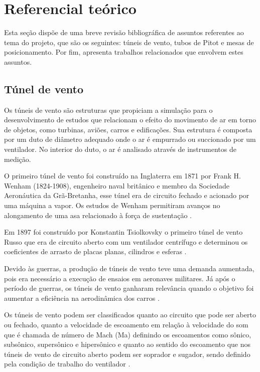 \chapter{Referencial teórico}\label{ch:referencial}

Esta seção dispõe de uma breve revisão bibliográfica de assuntos referentes ao tema do projeto, que são 
os seguintes: túneis de vento, tubos de Pitot e mesas de posicionamento. Por fim, apresenta trabalhos 
relacionados que envolvem estes assuntos.

\section{Túnel de vento}\label{sec:tunel}

Os túneis de vento são estruturas que propiciam a simulação para o desenvolvimento de estudos que relacionam 
o efeito do movimento de ar em torno de objetos, como turbinas, aviões, carros e edificações. Sua estrutura 
é composta por um duto de diâmetro adequado onde o ar é empurrado ou succionado por um ventilador. No 
interior do duto, o ar é analisado através de instrumentos de medição.

O primeiro túnel de vento foi construído na Inglaterra em 1871 por Frank H. Wenham (1824-1908), engenheiro 
naval britânico e membro da Sociedade Aeronáutica da Grã-Bretanha, esse túnel era de circuito fechado e 
acionado por uma máquina a vapor. Os estudos de Wenham permitiram avanços no alongamento de uma asa 
relacionado à força de sustentação \cite{carminatti2019desenvolvimento}.

Em 1897 foi construído por Konstantin Tsiolkovsky o primeiro túnel de vento Russo que era de circuito 
aberto com um ventilador centrífugo e determinou os coeficientes de arrasto de placas planas, cilindros 
e esferas \cite{joglekar2014design}. 

Devido às guerras, a produção de túneis de vento teve uma demanda aumentada, pois era necessário a execução 
de ensaios em aeronaves militares. Já após o período de guerras, os túneis de vento ganharam relevância 
quando o objetivo foi aumentar a eficiência na aerodinâmica dos carros \cite{de2014adalberto}. 

Os túneis de vento podem ser classificados quanto ao circuito que pode ser aberto ou fechado, quanto a velocidade 
de escoamento em relação à velocidade do som que é chamada de número de Mach (Ma) definindo os escoamentos como sônico, 
subsônico, supersônico e hipersônico e quanto ao sentido do escoamento que nos túneis de vento de circuito aberto podem 
ser soprador e sugador, sendo definido pela condição de trabalho do ventilador \cite{pritchard2005fox}.


